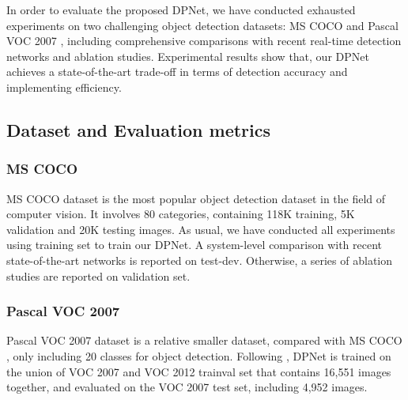 \documentclass[lettersize,journal]{IEEEtran}
\begin{document}
In order to evaluate the proposed DPNet, we have conducted exhausted experiments on two challenging object detection datasets: MS COCO\cite{lin2014microsoft} and Pascal VOC 2007 \cite{everingham2010pascal}, including comprehensive comparisons with recent real-time detection networks and ablation studies. Experimental results show that, our DPNet achieves a state-of-the-art trade-off in terms of detection accuracy and implementing efficiency.

\subsection{ Dataset and Evaluation metrics}
\subsubsection{MS COCO}
MS COCO dataset \cite{lin2014microsoft} is the most popular object detection dataset in the field of computer vision. It involves 80 categories, containing 118K training, 5K validation and 20K testing images. As usual, we have conducted all experiments using training set to train our DPNet. A system-level comparison with recent state-of-the-art networks is reported on test-dev. Otherwise, a series of ablation studies are reported on validation set.
\subsubsection{Pascal VOC 2007}
Pascal VOC 2007 dataset \cite{everingham2010pascal} is a relative smaller dataset, compared with MS COCO \cite{lin2014microsoft}, only including 20 classes for object detection. Following \cite{Pelee,li2018tiny}, DPNet is trained on the union of VOC 2007 and VOC 2012 trainval set that contains 16,551 images together, and evaluated on the VOC 2007 test set, including 4,952 images. 
\end{document}
